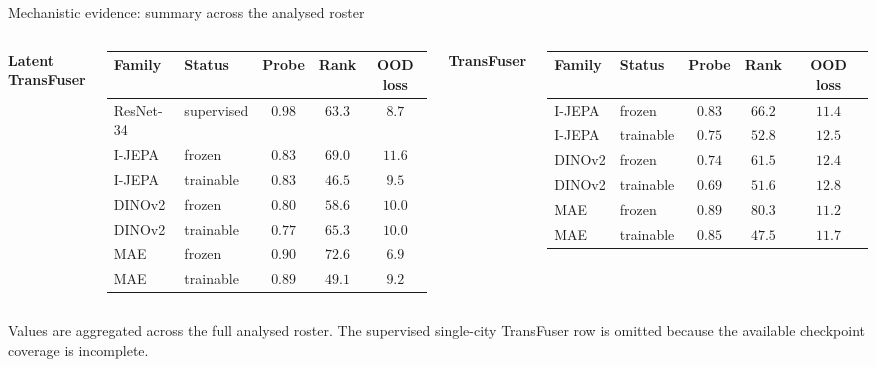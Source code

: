 \documentclass[aspectratio=169, xcolor={table}]{beamer}
\begin{document}
\begin{frame}{Mechanistic evidence: summary across the analysed roster}
  \begin{columns}[T]
    \centering
    \textbf{Latent TransFuser}
    \vspace{2pt}
    \scriptsize
    \begin{tabular}{@{}l l c c c@{}}
      \toprule
      \textbf{Family} & \textbf{Status} & \textbf{Probe} & \textbf{Rank} & \textbf{OOD loss} \\
      \midrule
      ResNet-34 & supervised & $0.98$ & $63.3$ & $8.7$ \\
      I-JEPA    & frozen     & $0.83$ & $69.0$ & $11.6$ \\
      I-JEPA    & trainable  & $0.83$ & $46.5$ & $9.5$ \\
      DINOv2    & frozen     & $0.80$ & $58.6$ & $10.0$ \\
      DINOv2    & trainable  & $0.77$ & $65.3$ & $10.0$ \\
      MAE       & frozen     & $0.90$ & $72.6$ & $\mathbf{6.9}$ \\
      MAE       & trainable  & $0.89$ & $49.1$ & $9.2$ \\
      \bottomrule
    \end{tabular}
    \centering
    \textbf{TransFuser}
    \vspace{2pt}
    \scriptsize
    \begin{tabular}{@{}l l c c c@{}}
      \toprule
      \textbf{Family} & \textbf{Status} & \textbf{Probe} & \textbf{Rank} & \textbf{OOD loss} \\
      \midrule
      I-JEPA & frozen    & $0.83$ & $66.2$ & $11.4$ \\
      I-JEPA & trainable & $0.75$ & $52.8$ & $12.5$ \\
      DINOv2 & frozen    & $0.74$ & $61.5$ & $12.4$ \\
      DINOv2 & trainable & $0.69$ & $51.6$ & $12.8$ \\
      MAE    & frozen    & $0.89$ & $\mathbf{80.3}$ & $\mathbf{11.2}$ \\
      MAE    & trainable & $0.85$ & $47.5$ & $11.7$ \\
      \bottomrule
    \end{tabular}
  \end{columns}
  \vspace{6pt}
  \footnotesize Values are aggregated across the full analysed roster. The supervised single-city TransFuser row is omitted because the available checkpoint coverage is incomplete.
\end{frame}
\end{document}
